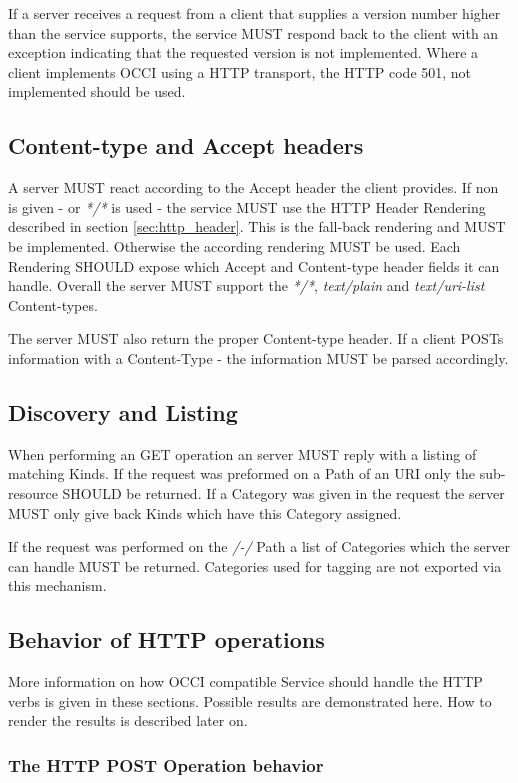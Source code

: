 \documentclass[10pt,a4paper]{article}
\begin{document}
If a server receives a request from a client that supplies a version number higher than the service supports, the service MUST respond back to the client with an exception indicating that the requested version is not implemented. Where a client implements OCCI using a HTTP transport, the HTTP code 501, not implemented should be used. 

\subsection{Content-type and Accept headers}
A server MUST react according to the Accept header the client provides. If non is given - or \textit{*/*} is used - the service MUST use the HTTP Header Rendering described in section \ref{sec:http_header}. This is the fall-back rendering and MUST be implemented. Otherwise the according rendering MUST be used. Each Rendering SHOULD expose which Accept and Content-type header fields it can handle. Overall the server MUST support the \textit{*/*}, \textit{text/plain} and \textit{text/uri-list} Content-types.

The server MUST also return the proper Content-type header. If a client POSTs information with a Content-Type - the information MUST be parsed accordingly.

\subsection{Discovery and Listing}
When performing an GET operation an server MUST reply with a listing of matching Kinds. If the request was preformed on a Path of an URI only the sub-resource SHOULD be returned. If a Category was given in the request the server MUST only give back Kinds which have this Category assigned.

If the request was performed on the \textit{/-/} Path a list of Categories which the server can handle MUST be returned. Categories used for tagging are not exported via this mechanism.

\subsection{Behavior of HTTP operations}

More information on how OCCI compatible Service should handle the HTTP verbs is given in these sections. Possible results are demonstrated here. How to render the results is described later on.

\subsubsection{The HTTP POST Operation behavior}
\end{document}
